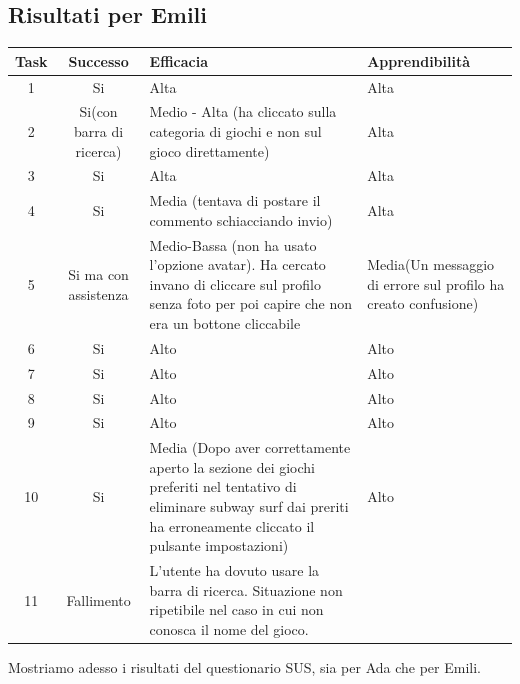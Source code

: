 \documentclass[../Report.tex]{subfiles}
\begin{document}
    \subsection{Risultati per Emili}
    \begin{table}[H]
        \begin{tabular}{|c|c|p{5cm}|p{4cm}|}
            \hline
            Task & Successo & Efficacia & Apprendibilità \\
            \hline
            1 & Si & Alta & Alta \\
            \hline
            2 & Si(con barra di ricerca) & Medio - Alta (ha cliccato sulla categoria di giochi e non sul gioco direttamente) & Alta \\
            \hline
            3 & Si & Alta & Alta \\
            \hline
            4 & Si & Media (tentava di postare il commento schiacciando invio) & Alta \\
            \hline
            5 & Si ma con assistenza & Medio-Bassa
            (non ha usato l’opzione avatar). Ha cercato invano di cliccare sul profilo senza foto per poi capire che non era un bottone cliccabile & Media(Un messaggio di errore sul profilo ha creato confusione)   \\
            \hline
            6 & Si & Alto & Alto \\
            \hline
            7 & Si & Alto & Alto \\
            \hline
            8 & Si & Alto & Alto \\
            \hline
            9 & Si & Alto & Alto \\
            \hline
            10 & Si & Media (Dopo aver correttamente aperto la sezione dei giochi preferiti nel tentativo di eliminare subway surf dai preriti ha erroneamente cliccato il pulsante impostazioni) & Alto \\
            \hline 
            11 & Fallimento & L’utente ha dovuto usare la barra di ricerca. Situazione non ripetibile nel caso in cui non conosca il nome del gioco. & \\
            \hline
        \end{tabular}
    \end{table}
    Mostriamo adesso i risultati del questionario SUS, sia per Ada che per Emili. 
\end{document}

